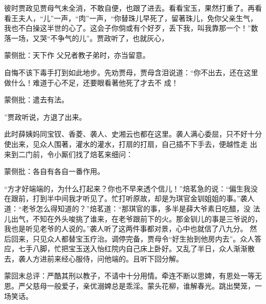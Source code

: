 \begin{parag}


    彼时贾政见贾母气未全消，不敢自便，也跟了进去。看看宝玉，果然打重了。再看看王夫人，“儿”一声，“肉”一声，“你替珠儿早死了，留著珠儿，免你父亲生气，我也不白操这半世的心了。这会子你倘或有个好歹，丢下我，叫我靠那一个！”数落一场，又哭“不争气的儿”。贾政听了，也就灰心，\begin{note}蒙侧批：天下作 父兄者教子弟时，亦当留意。\end{note}自悔不该下毒手打到如此地步。先劝贾母，贾母含泪说道：“你不出去，还在这里做什么！难道于心不足，还要眼看著他死了才去不 成！\begin{note}蒙侧批：遣去有法。\end{note}”贾政听说，方退了出来。
\end{parag}


\begin{parag}


    此时薛姨妈同宝钗、香菱、袭人、史湘云也都在这里。袭人满心委屈，只不好十分使出来，见众人围著，灌水的灌水，打扇的打扇，自己插不下手去，便越性走 出来到二门前，令小厮们找了焙茗来细问：\begin{note}蒙侧批：各自有各自一番作用。\end{note}“方才好端端的，为什么打起来？你也不早来透个信儿！”焙茗急的说：“偏生我没在跟前，打到半中间我才听见了。忙打听原故，却是为琪官金钏姐姐的事。”袭人道：“老爷怎么得知道的？”焙茗道：“那琪官的事，多半是薛大爷素日吃醋，没 法儿出气，不知在外头唆挑了谁来，在老爷跟前下的火。那金钏儿的事是三爷说的，我也是听见老爷的人说的。”袭人听了这两件事都对景，心中也就信了八九分。 然后回来，只见众人都替宝玉疗治。调停完备，贾母令“好生抬到他房内去”。众人答应，七手八脚，忙把宝玉送入怡红院内自己床上卧好。又乱了半日，众人渐渐散去，袭人方进前来经心服侍，问他端的。且听下回分解。
\end{parag}

\begin{parag}

    \begin{note}蒙回末总评：严酷其刑以教子，不请中十分用情。牵连不断以思婢，有恩处一等无恩。严父慈母一般爱子，亲优溺婢总是乖淫。蒙头花柳，谁解春光。跳出樊笼，一场笑话。\end{note}
\end{parag}


